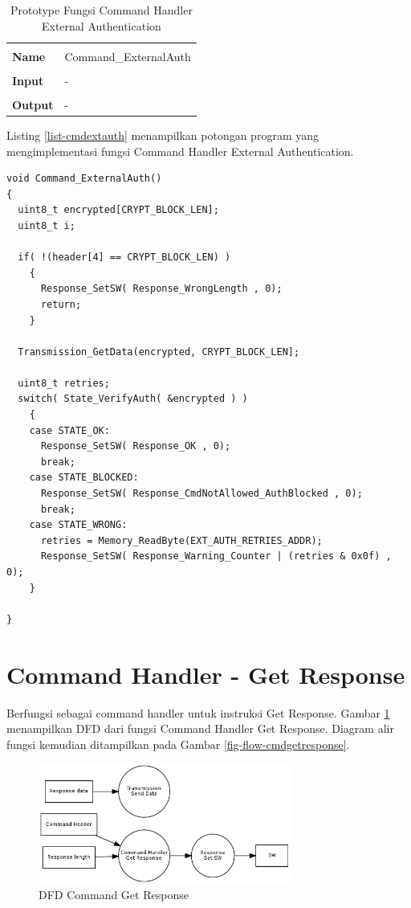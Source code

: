 \begin{table}[h]
  \centering
  \begin{tabular}{p{2cm} p{8cm}}
    \hline\\
    {\bf Name} & Command\_ExternalAuth\\
    \hline\\
    {\bf Input} & -
    \\
    \hline\\
    {\bf Output} & -
    \\
    \hline
  \end{tabular}
  \caption{Prototype Fungsi Command Handler External Authentication}
  \label{tabel-cmdextauth}
\end{table}

Listing \ref{list-cmdextauth} menampilkan potongan program yang mengimplementasi fungsi Command Handler External Authentication.

\begin{lstlisting}[caption={Listing Program Fungsi Command Handler External Auth}, label={list-cmdextauth}]
void Command_ExternalAuth()
{
  uint8_t encrypted[CRYPT_BLOCK_LEN];
  uint8_t i;

  if( !(header[4] == CRYPT_BLOCK_LEN) )
    {
      Response_SetSW( Response_WrongLength , 0);
      return;
    }

  Transmission_GetData(encrypted, CRYPT_BLOCK_LEN];

  uint8_t retries;
  switch( State_VerifyAuth( &encrypted ) )
    {
    case STATE_OK:
      Response_SetSW( Response_OK , 0);
      break;
    case STATE_BLOCKED:
      Response_SetSW( Response_CmdNotAllowed_AuthBlocked , 0);
      break;
    case STATE_WRONG:
      retries = Memory_ReadByte(EXT_AUTH_RETRIES_ADDR);
      Response_SetSW( Response_Warning_Counter | (retries & 0x0f) , 0);
    }

}
\end{lstlisting}

\section{Command Handler - Get Response}
\label{sec_cmdgetresponse}

Berfungsi sebagai command handler untuk instruksi Get Response. Gambar \ref{fig-dfd-cmdgetresponse} menampilkan DFD dari fungsi Command Handler Get Response. Diagram alir fungsi kemudian ditampilkan pada Gambar \ref{fig-flow-cmdgetresponse}. 

\begin{figure}[h]
\centering
\includegraphics[width=0.74\textwidth]{image/command/dfd_cmdgetresponse.png}
\caption{DFD Command Get Response}
\label{fig-dfd-cmdgetresponse}
\end{figure}

